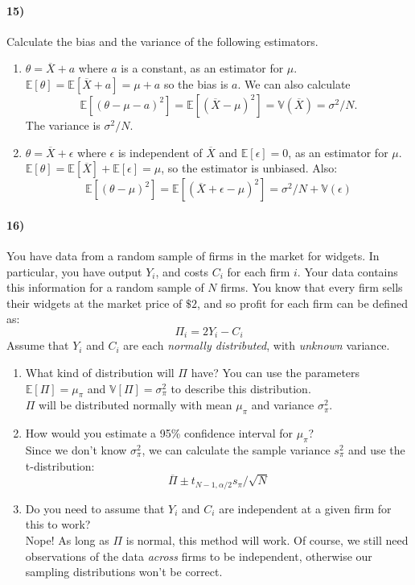 \documentclass[12pt]{article}
\newcommand\ov{\overline}
\newcommand\BB{\mathbb}
\newcommand\EE{\mathbb{E}}
\newcommand\eps{\epsilon}
\numberwithin{equation}{section}
\numberwithin{figure}{section}
\numberwithin{table}{section}
\begin{document}
\paragraph{15)} Calculate the bias and the variance of the following estimators.
\begin{enumerate}
\item $\theta=\ov{X}+a$ where $a$ is a constant, as an estimator for $\mu$.
{\color{blue} $\EE[\theta] = \EE[\ov{X}+a] = \mu + a$ so the bias is $a$. We can also calculate
\[ \EE[(\theta-\mu-a)^2] = \EE[(\ov{X}-\mu)^2] = \BB{V}(\ov{X}) = \sigma^2/N.\]
The variance is $\sigma^2/N$.}
\item $\theta=\ov{X}+\epsilon$ where $\epsilon$ is independent of $\ov{X}$ and $\EE[\epsilon]=0$, as an estimator for $\mu$.
{\color{blue} $\EE[\theta] = \EE[\ov{X}] + \EE[\eps] = \mu$, so the estimator is unbiased. Also:
\[\EE[(\theta-\mu)^2] = \EE[(\ov{X}+\eps-\mu)^2] = \sigma^2/N + \BB{V}(\eps)\]}
\end{enumerate}

\paragraph{16)}You have data from a random sample of firms in the market for widgets. In particular, you have output $Y_i$, and costs $C_i$ for each firm $i$. Your data contains this information for a random sample of $N$ firms. You know that every firm sells their widgets at the market price of $\$2$, and so profit for each firm can be defined as:
\[\Pi_i = 2 Y_i - C_i\]
Assume that $Y_i$ and $C_i$ are each \emph{normally distributed}, with \emph{unknown} variance.
\begin{enumerate}
\item What kind of distribution will $\Pi$ have? You can use the parameters $\EE[\Pi] = \mu_\pi$ and $\BB{V}[\Pi]=\sigma^2_\pi$ to describe this distribution.\\
{\color{blue} $\Pi$ will be distributed normally with mean $\mu_\pi$ and variance $\sigma^2_\pi$.}
\item How would you estimate a 95\% confidence interval for $\mu_\pi$? \\
{\color{blue} Since we don't know $\sigma^2_\pi$, we can calculate the sample variance $s^2_\pi$ and use the t-distribution:
\[\ov{\Pi} \pm t_{N-1,\alpha/2}s_\pi/\sqrt{N} \]}
\item Do you need to assume that $Y_i$ and $C_i$ are independent at a given firm for this to work? \\
{\color{blue} Nope! As long as $\Pi$ is normal, this method will work. Of course, we still need observations of the data \emph{across} firms to be independent, otherwise our sampling distributions won't be correct.}
\end{enumerate}
\end{document}
